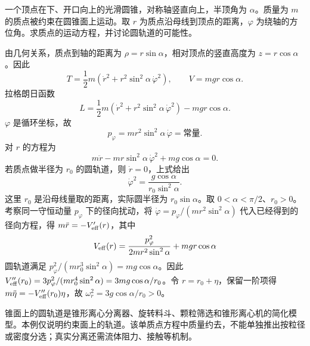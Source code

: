 \begin{example}[圆锥面上的圆轨道]
一个顶点在下、开口向上的光滑圆锥，对称轴竖直向上，半顶角为 $\alpha$。质量为 $m$ 的质点被约束在圆锥面上运动。取 $r$ 为质点沿母线到顶点的距离，$\varphi$ 为绕轴的方位角。求质点的运动方程，并讨论圆轨道的可能性。

\begin{center}
\end{center}

由几何关系，质点到轴的距离为 $\rho=r\sin\alpha$，相对顶点的竖直高度为 $z=r\cos\alpha$。因此
\[
T=\frac12m\left(\dot r^2+r^2\sin^2\alpha\,\dot\varphi^2\right),
\qquad
V=mgr\cos\alpha.
\]
拉格朗日函数
\[
L=\frac12m\left(\dot r^2+r^2\sin^2\alpha\,\dot\varphi^2\right)
-mgr\cos\alpha.
\]
$\varphi$ 是循环坐标，故
\[
p_\varphi=mr^2\sin^2\alpha\,\dot\varphi=\text{常量}.
\]
对 $r$ 的方程为
\[
m\ddot r-mr\sin^2\alpha\,\dot\varphi^2+mg\cos\alpha=0.
\]
若质点做半径为 $r_0$ 的圆轨道，则 $\dot r=0$，上式给出
\[
\dot\varphi^2=\frac{g\cos\alpha}{r_0\sin^2\alpha}.
\]
这里 $r_0$ 是沿母线量取的距离，实际圆半径为 $r_0\sin\alpha$。取 $0<\alpha<\pi/2$、$r_0>0$。考察同一守恒动量 $p_\varphi$ 下的径向扰动，将 $\dot\varphi=p_\varphi/(mr^2\sin^2\alpha)$ 代入已经得到的径向方程，得 $m\ddot r=-V_{\rm eff}'(r)$，其中
\[
V_{\rm eff}(r)=\frac{p_\varphi^2}{2mr^2\sin^2\alpha}+mgr\cos\alpha
\]
圆轨道满足 $p_\varphi^2/(mr_0^3\sin^2\alpha)=mg\cos\alpha$。因此 $V_{\rm eff}''(r_0)=3p_\varphi^2/(mr_0^4\sin^2\alpha)=3mg\cos\alpha/r_0$。令 $r=r_0+\eta$，保留一阶项得 $m\ddot\eta=-V_{\rm eff}''(r_0)\eta$，故 $\omega_r^2=3g\cos\alpha/r_0>0$。

\begin{modernbox}
锥面上的圆轨道是锥形离心分离器、旋转料斗、颗粒筛选和锥形离心机的简化模型。本例仅说明约束面上的轨道。该单质点方程中质量约去，不能单独推出按粒径或密度分选；真实分离还需流体阻力、接触等机制。
\end{modernbox}
\end{example}

